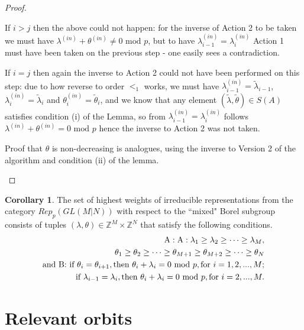 \documentclass[12pt]{amsart}
\numberwithin{equation}{section}
\numberwithin{equation}{section}
\theoremstyle{definition}
\newtheorem{corollary}[theorem]{Corollary}
\begin{document}
\begin{proof}
\begin{itemize}
        If $i>j$ then the above could not happen: for the inverse of Action 2 to be taken we must have $\lambda^{(in)} + \theta^{(in)} \ne 0\text{ mod }p$, but to have $\lambda^{(in)}_{i-1}=\lambda^{(in)}_{i}$ Action 1 must have been taken on the previous step  - one easily sees a contradiction.

        If $i=j$  then again the inverse to Action 2 could not have been performed on this step: due to how reverse to order $<_1$ works, we must have $\lambda^{(in)}_{i-1}=\tilde\lambda_{i-1} $, $\lambda^{(in)}_{i}= \tilde\lambda_{i}$ and $\theta^{(in)}_{i}= \tilde\theta_{i}$, and we know that any element $(\tilde\lambda,\tilde\theta)\in S(A)$ satisfies condition (i) of the Lemma, so from $\lambda^{(in)}_{i-1}=\lambda^{(in)}_{i}$ follows $\lambda^{(in)} + \theta^{(in)} = 0\text{ mod }p$ hence the inverse to Action 2 was not taken.

        Proof that $\theta$ is non-decreasing is analogues, using the inverse to Version 2 of the algorithm and condition (ii) of the lemma.

    \end{itemize}
\end{proof}

\begin{corollary}
    \label{corollary_weights}
    The set of highest weights of irreducible representations from the category $Rep_p(GL(M|N))$ with respect to the ``mixed" Borel subgroup consists of tuples $(\lambda,\theta) \in \mathbb{Z}^M\times \mathbb{Z}^N$ that satisfy the following conditions.
\begin{equation}\label{condition 3.4}
  \begin{split}
    \textnormal{A}:    \textnormal{A}:    \lambda_1\geq\lambda_2\geq\cdots\geq \lambda_M,\\
        \theta_{1}\geq \theta_2\geq\cdots\geq\theta_{M+1}\geq\theta_{M+2}\geq\cdots \geq \theta_{N}\\
        \textnormal{and B: if }  \theta_i=\theta_{i+1}, \textnormal{then } \theta_i+\lambda_i=0 \text{ mod }p, \textnormal{for } i=1,2,..., M;\\
        \textnormal{if } \lambda_{i-1}=\lambda_i, \textnormal{then } \theta_i+\lambda_i=0 \text{ mod }p, \textnormal{for } i=2,..., M.
    \end{split}
\end{equation}
\end{corollary}

\section{Relevant orbits}
\end{document}
